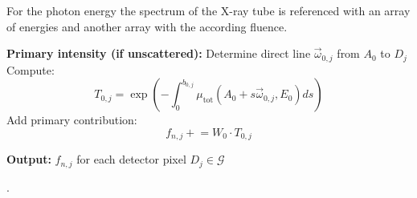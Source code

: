 For the photon energy the spectrum of the X-ray tube is referenced with an array
of energies and another array with the according fluence.

\begin{algorithmic}
\State \textbf{Primary intensity (if unscattered):}
    \State Determine direct line $\vec{\omega}_{0,j}$ from $A_0$ to $D_j$
    \State Compute:
    \[
    T_{0,j} = \exp\left(-\int_0^{b_{0,j}} \mu_{\text{tot}}(A_0 + s\vec{\omega}_{0,j}, E_0) ds\right)
    \]
    \State Add primary contribution:
    \[
    f_{n,j} \mathrel{+}= W_0 \cdot T_{0,j}
    \]
\EndFor

\State \textbf{Output:} $f_{n,j}$ for each detector pixel $D_j \in \mathcal{G}$

\end{algorithmic}



























\pagebreak
.


